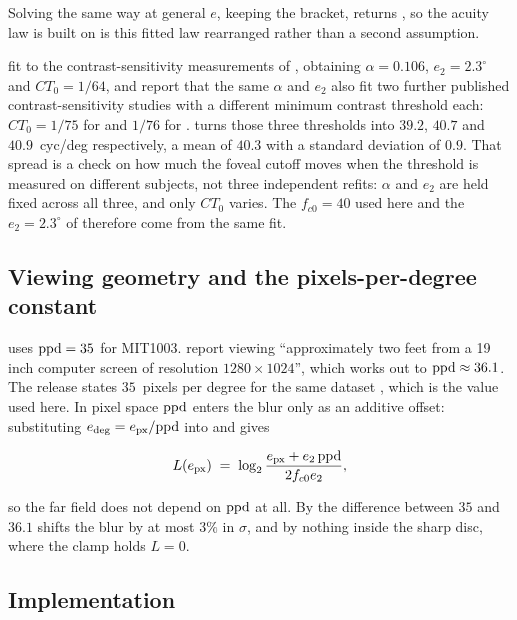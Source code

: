 Solving the same way at general $e$, keeping the bracket, returns , so the acuity law
 is built on is this fitted law rearranged rather than a second assumption.

\citet{geislerperry1998} fit  to the contrast-sensitivity measurements of
\citet{robson1981}, obtaining $\alpha = 0.106$, $e_2 = 2.3^\circ$ and $CT_0 = 1/64$, and report that the
same $\alpha$ and $e_2$ also fit two further published contrast-sensitivity studies with a different
minimum contrast threshold each: $CT_0 = 1/75$ for \citet{arnow1996} and $1/76$ for \citet{banks1991}.
 turns those three thresholds into $39.2$, $40.7$ and $40.9$~cyc/deg
respectively, a mean of $40.3$ with a standard deviation of $0.9$. That spread is a check on how much the foveal cutoff moves when the threshold is
measured on different subjects, not three independent refits: $\alpha$ and $e_2$ are held fixed across
all three, and only $CT_0$ varies. The $f_{c0} = 40$ used here and the $e_2 = 2.3^\circ$ of
 therefore come from the same fit.

\subsection*{Viewing geometry and the pixels-per-degree constant}

 uses $\mathrm{ppd} = 35$ for MIT1003. \citet{judd2009mit1003} report viewing
\enquote{approximately two feet from a 19 inch computer screen of resolution $1280 \times 1024$}, which
works out to $\mathrm{ppd} \approx 36.1$. The \dg{} release states $35$~pixels per degree for the same dataset
\citep{deepgazepytorch}, which is the value used here.
In pixel space $\mathrm{ppd}$ enters the blur only as an additive offset: substituting
$e_{\text{deg}} = e_{\text{px}}/\mathrm{ppd}$ into  and  gives

\begin{equation}
  L(e_{\text{px}}) \;=\; \log_2 \frac{e_{\text{px}} + e_2\,\mathrm{ppd}}{2 f_{c0} e_2},
  \label{eq:level-pixels}
\end{equation}

so the far field does not depend on $\mathrm{ppd}$ at all. By  the difference between $35$
and $36.1$ shifts the blur by at most $3\%$ in $\sigma$, and by nothing inside the sharp disc, where the
clamp holds $L = 0$.

\subsection*{Implementation}

